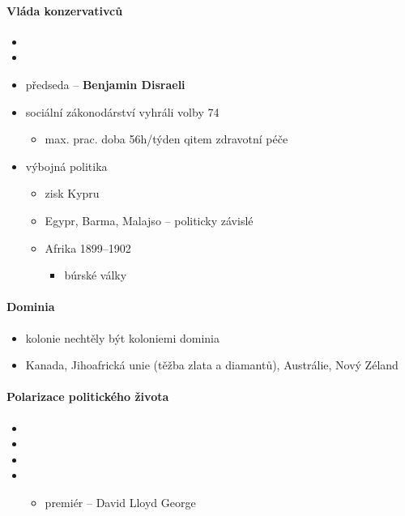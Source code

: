 \paragraph{Vláda konzervativců}
\begin{itemize}
\item {}
\item {}
\item předseda -- \textbf{Benjamin Disraeli}
\item sociální zákonodárství \ra vyhráli volby 74
	\begin{itemize}
	\item max. prac. doba 56h/týden
	qitem zdravotní péče
	\end{itemize}
\item výbojná politika
	\begin{itemize}
	\item zisk Kypru
	\item Egypr, Barma, Malajso -- politicky závislé
	\item Afrika 1899--1902
		\begin{itemize}
		\item búrské války
		\end{itemize}
	\end{itemize}
\end{itemize}

\paragraph{Dominia}
\begin{itemize}
\item kolonie nechtěly být koloniemi \ra dominia
\item Kanada, Jihoafrická unie (těžba zlata a diamantů), Austrálie, Nový Zéland
\end{itemize}

\paragraph{Polarizace politického života}
\begin{itemize}
\item {}
\item {}
\item {}
\item {}
	\begin{itemize}
	\item premiér -- David Lloyd George
	\end{itemize}
\end{itemize}

